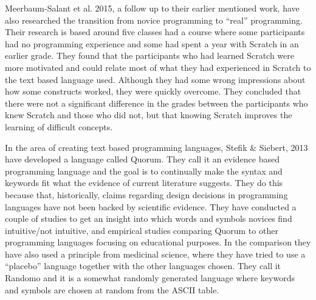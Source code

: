 Meerbaum-Salant et al. 2015\cite{from_scratch_to_real}, a follow up to their earlier mentioned work, have also researched the transition from novice programming to ``real'' programming. Their research is based around five classes had a course where some participants had no programming experience and some had spent a year with Scratch in an earlier grade. They found that the participants who had learned Scratch were more motivated and could relate most of what they had experienced in Scratch to the text based language used. Although they had some wrong impressions about how some constructs worked, they were quickly overcome. They concluded that there were not a significant difference in the grades between the participants who knew Scratch and those who did not, but that knowing Scratch improves the learning of difficult concepts.

In the area of creating text based programming languages, Stefik \& Siebert, 2013\cite{stefik_all_studies} have developed a language called Quorum. They call it an evidence based programming language and the goal is to continually make the syntax and keywords fit what the evidence of current literature suggests. They do this because that, historically, claims regarding design decisions in programming languages have not been backed by scientific evidence\cite{ShaneMarkstrum10}. They have conducted a couple of studies to get an insight into which words and symbols novices find intuitive/not intuitive, and empirical studies comparing Quorum to other programming languages focusing on educational purposes. In the comparison they have also used a principle from medicinal science, where they have tried to use a ``placebo'' language together with the other languages chosen. They call it Randomo and it is a somewhat randomly generated language where keywords and symbols are chosen at random from the ASCII table.



